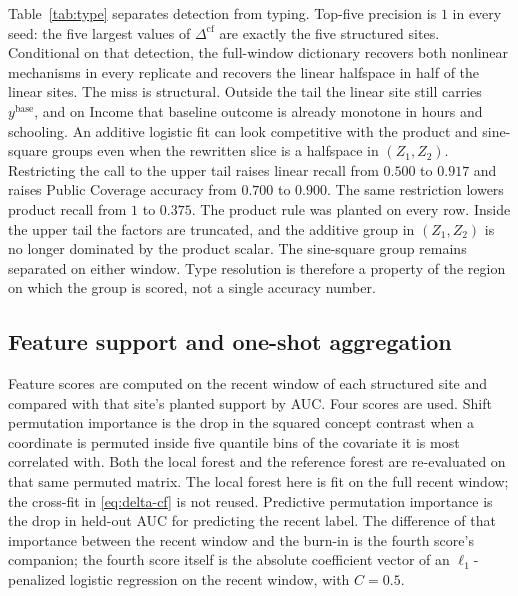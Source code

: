 Table~\ref{tab:type} separates detection from typing.
Top-five precision is $1$ in every seed: the five largest values of
$\Delta^{\mathrm{cf}}$ are exactly the five structured sites.
Conditional on that detection, the full-window dictionary recovers both
nonlinear mechanisms in every replicate and recovers the linear halfspace
in half of the linear sites.
The miss is structural.
Outside the tail the linear site still carries $y^{\mathrm{base}}$, and on
Income that baseline outcome is already monotone in hours and schooling.
An additive logistic fit can look competitive with the product and
sine-square groups even when the rewritten slice is a halfspace in
$(Z_1,Z_2)$.
Restricting the call to the upper tail raises linear recall from $0.500$
to $0.917$ and raises Public Coverage accuracy from $0.700$ to $0.900$.
The same restriction lowers product recall from $1$ to $0.375$.
The product rule was planted on every row.
Inside the upper tail the factors are truncated, and the additive group
in $(Z_1,Z_2)$ is no longer dominated by the product scalar.
The sine-square group remains separated on either window.
Type resolution is therefore a property of the region on which the group
is scored, not a single accuracy number.

\subsection{Feature support and one-shot aggregation}
\label{sec:features}

Feature scores are computed on the recent window of each structured site
and compared with that site's planted support by AUC.
Four scores are used.
Shift permutation importance is the drop in the squared concept contrast
when a coordinate is permuted inside five quantile bins of the covariate
it is most correlated with.
Both the local forest and the reference forest are re-evaluated on that
same permuted matrix.
The local forest here is fit on the full recent window; the cross-fit in
\eqref{eq:delta-cf} is not reused.
Predictive permutation importance is the drop in held-out AUC for
predicting the recent label.
The difference of that importance between the recent window and the burn-in
is the fourth score's companion; the fourth score itself is the absolute coefficient vector of an
$\ell_1$-penalized logistic regression on the recent window, with
$C=0.5$.

